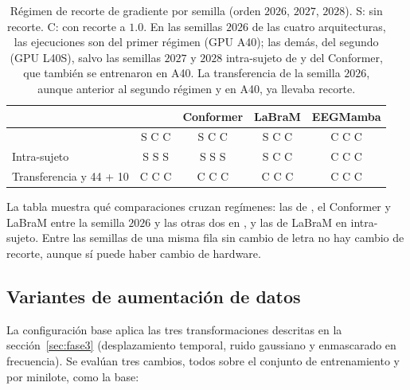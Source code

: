 \begin{table}[H]
\centering
\caption{Régimen de recorte de gradiente por semilla (orden $2026$, $2027$, $2028$).
S: sin recorte. C: con recorte a $1.0$. En las semillas $2026$ de las cuatro arquitecturas,
las ejecuciones son del primer régimen (GPU A40); las demás, del segundo (GPU
L40S), salvo las semillas $2027$ y $2028$ intra-sujeto de \eegnet{} y del Conformer, que
también se entrenaron en A40. La transferencia de la semilla $2026$, aunque anterior al segundo régimen y
en A40, ya llevaba recorte.}
\label{tab:regimen}
\small
\begin{tabular}{lcccc}
\toprule
 & \textbf{\eegnet{}} & \textbf{Conformer} & \textbf{LaBraM} & \textbf{EEGMamba} \\
\midrule
\loso{}                          & S C C & S C C & S C C & C C C \\
Intra-sujeto                     & S S S & S S S & S C C & C C C \\
Transferencia y 44 + 10          & C C C & C C C & C C C & C C C \\
\bottomrule
\end{tabular}
\end{table}

La tabla muestra qué comparaciones cruzan regímenes: las de \eegnet{}, el Conformer y
LaBraM entre la semilla $2026$ y las otras dos en \loso{}, y las de LaBraM en
intra-sujeto. Entre las semillas de una misma fila sin cambio de letra no hay cambio de
recorte, aunque sí puede haber cambio de hardware.



\subsection{Variantes de aumentación de datos}
\label{sec:variantes-aug}

La configuración base aplica las tres transformaciones descritas en la
sección~\ref{sec:fase3} (desplazamiento temporal, ruido gaussiano y enmascarado en
frecuencia). Se evalúan tres cambios, todos sobre el conjunto de entrenamiento y por
minilote, como la base:

